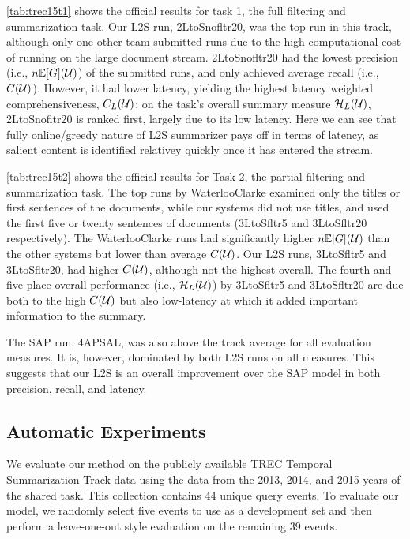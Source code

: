 \autoref{tab:trec15t1} shows the official results for task 1, the full
filtering and summarization task. Our L2S run, 2LtoSnofltr20, was the top run
in this track, although only one other team submitted runs due to the high
computational cost of running on the large document stream.  2LtoSnofltr20 had
the lowest precision (i.e., $n\mathbb{E}[G](\mathcal{U})$) of the
submitted runs, and only achieved average recall (i.e.,
$C(\mathcal{U})$).  However, it had lower latency, yielding the highest
latency weighted comprehensiveness, $C_L(\mathcal{U})$; on the task's
overall summary measure $\mathcal{H}_L(\mathcal{U})$, 2LtoSnofltr20 is
ranked first, largely due to its low latency.  Here we can see that fully
online/greedy nature of L2S summarizer pays off in terms of latency, as salient
content is identified relativey quickly once it has entered the stream.



\autoref{tab:trec15t2} shows the official results for Task 2, the partial
filtering and summarization task. The top runs by WaterlooClarke examined only
the titles or first sentences of the documents, while our systems did not use
titles, and used the first five or twenty sentences of documents (3LtoSfltr5
and 3LtoSfltr20 respectively). The WaterlooClarke runs had significantly higher
$n\mathbb{E}[G](\mathcal{U})$ than the other systems but lower than
average $C(\mathcal{U})$. Our L2S runs, 3LtoSfltr5 and 3LtoSfltr20, had
higher $C(\mathcal{U})$, although not the highest overall. The fourth
and five place overall performance (i.e., $\mathcal{H}_L(\mathcal{U})$) by
3LtoSfltr5 and 3LtoSfltr20 are due both to the high $C(\mathcal{U})$ but
also low-latency at which it added important information to the summary.

The SAP run, 4APSAL, was also above the track average for all evaluation
measures. It is, however, dominated by both L2S runs on all measures.  This
suggests that our L2S is an overall improvement over the SAP model in both
precision, recall, and latency. 

\subsection{Automatic Experiments} We evaluate our method on the publicly
available TREC Temporal Summarization Track data using the data from the 2013,
2014, and 2015 years of the shared task. This collection contains  44 unique
query events.  To evaluate our model, we randomly select five events to use as
a development set and then perform a leave-one-out style evaluation on the
remaining 39 events.

